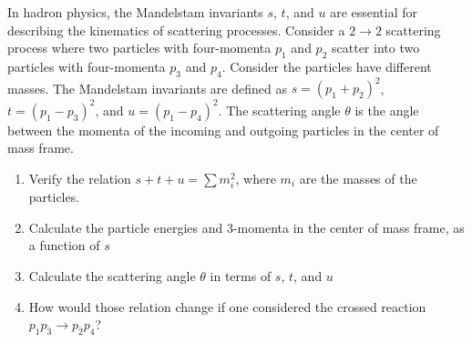 
\newcommand{\ma}{\ensuremath{M}\xspace}
\newcommand{\mb}{\ensuremath{m_1}\xspace}
\newcommand{\mc}{\ensuremath{m_2}\xspace}
\newcommand{\eb}{\ensuremath{E_1}\xspace}
\newcommand{\ec}{\ensuremath{E_2}\xspace}

\newcommand{\pb}{\ensuremath{p_1}\xspace}
\newcommand{\pc}{\ensuremath{p_2}\xspace}
\newcommand{\pvecb}{\ensuremath{\textbf{p}_1}\xspace}
\newcommand{\pvecc}{\ensuremath{\textbf{p}_2}\xspace}
\newcommand{\pvecstar}{\ensuremath{\textbf{p}^{*}}\xspace}
\newcommand{\pmodvecb}{\ensuremath{\text{p}_1}\xspace}
\newcommand{\pmodvecc}{\ensuremath{\text{p}_2}\xspace}
\newcommand{\pmodvecstar}{\ensuremath{\text{p}^{*}}\xspace}


In hadron physics, the Mandelstam invariants $s$, $t$, and $u$ are essential for describing the kinematics of scattering processes.
Consider a $2 \rightarrow 2$ scattering process where two particles with four-momenta $p_1$ and $p_2$ scatter into two particles with four-momenta $p_3$ and $p_4$.
Consider the particles have different masses. The Mandelstam invariants are defined as $s = (p_1 + p_2)^2$, $t = (p_1 - p_3)^2$, and $u = (p_1 - p_4)^2$.
The scattering angle $\theta$ is the angle between the momenta of the incoming and outgoing particles in the center of mass frame.

\begin{enumerate}
    \item Verify the relation $s + t + u = \sum m_i^2$, where $m_i$ are the masses of the particles.
    \item Calculate the particle energies and 3-momenta in the center of mass frame, as a function of $s$
    \item Calculate the scattering angle  $\theta$ in terms of $s$, $t$, and $u$
    \item How would those relation change if one considered the crossed reaction $p_1 p_{\bar 3} \to p_{\bar 2} p_4$?
\end{enumerate}
